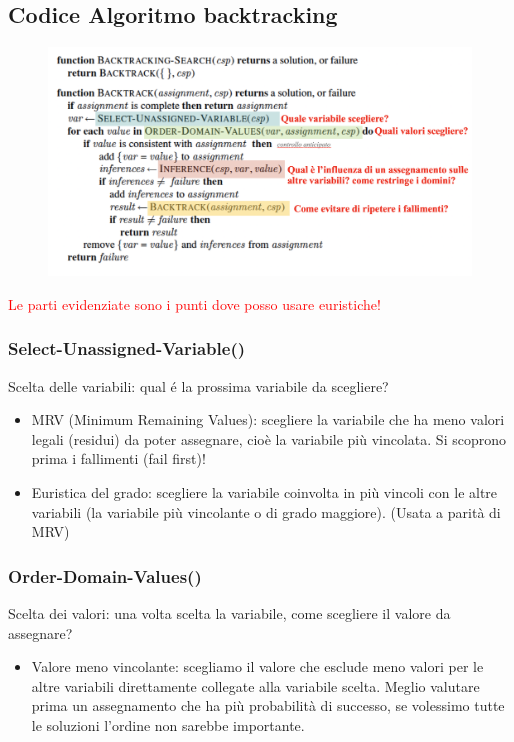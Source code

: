 \documentclass{article}
\begin{document}
\subsection{Codice Algoritmo backtracking}
\begin{figure}[H]
\centering
\includegraphics[scale=0.4]{Images/algoritmobacktracking.png}
\end{figure}
\textcolor{red}{Le parti evidenziate sono i punti dove posso usare euristiche!}
\subsubsection{Select-Unassigned-Variable()}
Scelta delle variabili: qual é la prossima variabile da scegliere?
\begin{itemize}
    \item MRV (Minimum Remaining Values): scegliere la variabile che ha meno valori legali (residui) da poter assegnare, cioè la variabile più vincolata. Si scoprono prima i fallimenti (fail first)!
    \item Euristica del grado: scegliere la variabile coinvolta in più vincoli con le altre variabili (la variabile più vincolante o di grado maggiore). (Usata a parità di MRV)
\end{itemize}

\subsubsection{Order-Domain-Values()}
Scelta dei valori: una volta scelta la variabile, come scegliere il valore da assegnare?
\begin{itemize}
    \item Valore meno vincolante: scegliamo il valore che esclude meno valori per le altre variabili direttamente collegate alla variabile scelta. Meglio valutare prima un assegnamento che ha più probabilità di successo, se volessimo tutte le soluzioni l’ordine non sarebbe importante.
\end{itemize}
\end{document}
